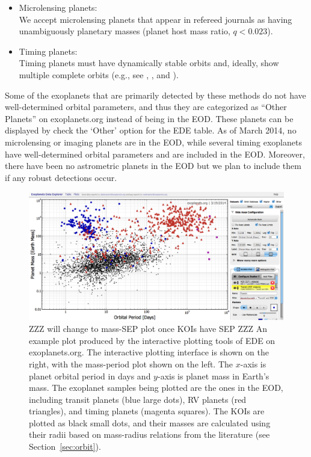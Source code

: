 \documentclass[11pt,preprint]{aastex}
\begin{document}
\begin{CJK*}{UTF8}{gbsn}
\begin{itemize}
\begin{enumerate}
\end{enumerate}
\item Microlensing planets:\\
  We accept microlensing planets that appear in refereed journals as
  having unambiguously planetary masses (planet host mass ratio,
  $q<0.023$). 

\item Timing planets:\\
  Timing planets must have dynamically stable orbits and, ideally, show
  multiple complete orbits (e.g., see \citealt{Wittenmyer2012},
  \citealt{Horner2012}, and \citealt{Wittenmyer2013}). 

\end{itemize}
Some of the exoplanets that are primarily detected by these methods do
not have well-determined orbital parameters, and thus they are
categorized as ``Other Planets'' on exoplanets.org instead of being in
the EOD. These planets can be displayed by check the `Other' option
for the EDE table. As of March 2014, no microlensing or imaging
planets are in the EOD, while several timing exoplanets have
well-determined orbital parameters and are included in the
EOD. Moreover, there have been no astrometric planets in the EOD but we
plan to include them if any robust detections occur.


\begin{figure}[!htb]
\centering
\includegraphics[width=\textwidth]{../fig/mass-per-interactive.eps}
\caption{ZZZ will change to mass-SEP plot once KOIs have SEP ZZZ
  An example plot produced by the interactive plotting tools of
  EDE on exoplanets.org. The interactive plotting interface is shown
  on the right, with the mass-period plot shown on the left. The
  $x$-axis is planet orbital period in days and $y$-axis is planet
  mass in Earth's mass. The exoplanet samples being plotted are the
  ones in the EOD, including transit planets (blue large dots), RV
  planets (red triangles), and timing planets (magenta squares). The
  KOIs are plotted as black small dots, and their masses are
  calculated using their radii based on mass-radius relations from the
  literature (see Section~\ref{sec:orbit}).}
\label{fig:koi}
\end{figure}


\end{CJK*}
\end{document}
